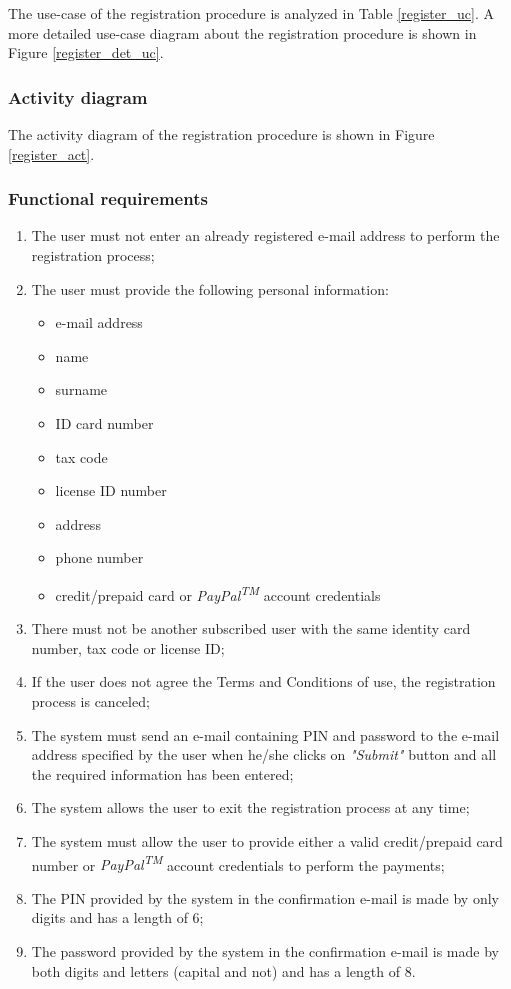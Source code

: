 The use-case of the registration procedure is analyzed in Table \ref{register_uc}.
A more detailed use-case diagram about the registration procedure is shown in Figure \ref{register_det_uc}.

\subsubsection{Activity diagram}

The activity diagram of the registration procedure is shown in Figure \ref{register_act}.

\subsubsection{Functional requirements}
\begin{enumerate}
\item The user must not enter an already registered e-mail address to perform the registration process;
\item The user must provide the following personal information:
	\begin{itemize}
	\item e-mail address
	\item name
	\item surname
	\item ID card number
	\item tax code
	\item license ID number
	\item address
	\item phone number
	\item credit/prepaid card or \emph{PayPal\textsuperscript{TM}} account credentials
	\end{itemize}
\item There must not be another subscribed user with the same identity card number, tax code or license ID;
\item If the user does not agree the Terms and Conditions of use, the registration process is canceled;
\item The system must send an e-mail containing PIN and password to the e-mail address specified by the user when he/she clicks on \emph{"Submit"} button and all the required information has been entered;
\item The system allows the user to exit the registration process at any time;
\item The system must allow the user to provide either a valid credit/prepaid card number or \emph{PayPal\textsuperscript{TM}} account credentials to perform the payments;
\item The PIN provided by the system in the confirmation e-mail is made by only digits and has a length of 6;
\item The password provided by the system in the confirmation e-mail is made by both digits and letters (capital and not) and has a length of 8.
\end{enumerate}

